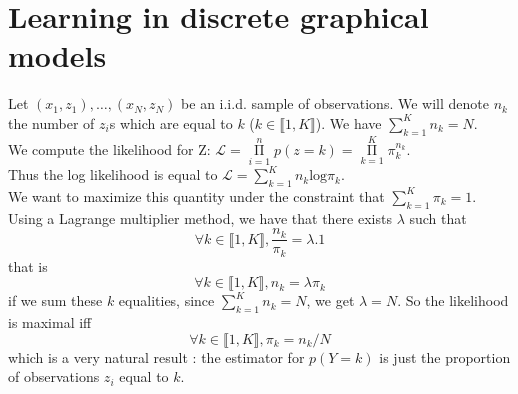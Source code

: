 \documentclass[11pt,a4paper]{article}
\begin{document}
\section{Learning in discrete graphical models}

Let $(x_1, z_1), \ldots, (x_N, z_N)$ be an i.i.d. sample of observations. We will denote $n_k$ the number of $z_i$s which are equal to $k$ ($k \in \llbracket 1, K \rrbracket$). We have $\sum\limits_{k=1}^{K} n_k = N$.
\\We compute the likelihood for Z: $\mathcal{L} = \mathop{\Pi}\limits_{i=1}^n p(z = k) = \mathop{\Pi}\limits_{k=1}^K \pi_k^{n_k}$.
\\Thus the log likelihood is equal to $\mathcal{L} = \sum\limits_{k=1}^K n_k \mathrm{log} \pi_k$.
\\We want to maximize this quantity under the constraint that $\sum\limits_{k=1}^{K} \pi_k = 1$. Using a Lagrange multiplier method, we have that there exists $\lambda$ such that $$\forall k \in \llbracket 1, K \rrbracket, \frac{n_k}{\pi_k} = \lambda . 1$$
that is $$\forall k \in \llbracket 1, K \rrbracket, n_k = \lambda \pi_k$$
if we sum these $k$ equalities, since $\sum\limits_{k=1}^{K} n_k = N$, we get $\lambda = N$.
So the likelihood is maximal iff $$\forall k \in \llbracket 1, K \rrbracket,  \pi_k = n_k/N$$
which is a very natural result : the estimator for $p(Y=k)$ is just the proportion of observations $z_i$ equal to $k$.
\end{document}
